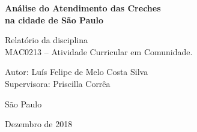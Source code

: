 \documentclass[12pt, a4paper]{book}
\begin{document}
	
	

	\newpage
	\thispagestyle{empty}
	\begin{center}
		\vspace*{2.3 cm}
		\textbf{\Large{Análise do Atendimento das Creches
				\\ na cidade de São Paulo}}
		\vspace*{2 cm}
	\end{center}
	
	\vskip 2cm
	
	\begin{flushright}
		Relatório da disciplina \\
		MAC0213 -- Atividade Curricular em Comunidade.
	\end{flushright}
	
	\vskip 5cm
	
	\begin{center}
		Autor: Luís Felipe de Melo Costa Silva \\
		Supervisora: Priscilla Corrêa
		
		\vskip 5cm
		\normalsize{São Paulo}
		
		\normalsize{Dezembro de 2018}
	\end{center}
	\pagebreak
	
	\tableofcontents  

	\mainmatter
	
	
	
	
	
	
	
	
	
	
	
	
	
	
	
	\appendix
	
	
	
	
	
	
	
	
	
\end{document}
